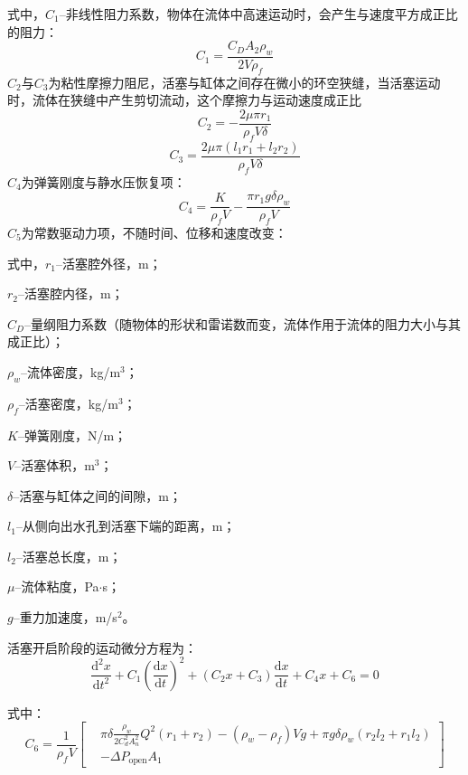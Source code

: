 式中，$C_1$--非线性阻力系数，物体在流体中高速运动时，会产生与速度平方成正比的阻力：
\begin{equation}
	C_1=\frac{C_DA_2\rho_w}{2V\rho_f}
\end{equation}
$C_2$与$C_3$为粘性摩擦力阻尼，活塞与缸体之间存在微小的环空狭缝，当活塞运动时，流体在狭缝中产生剪切流动，这个摩擦力与运动速度成正比
\begin{equation}
	C_2=-\frac{2\mu\pi r_1}{\rho_f V\delta}
\end{equation}
\begin{equation}
	C_3=\frac{2\mu\pi\left(l_1r_1+l_2r_2\right)}{\rho_f V \delta}
\end{equation}
$C_4$为弹簧刚度与静水压恢复项：
\begin{equation}
	C_4=\frac{K}{\rho_f V}-\frac{\pi r_1 g \delta \rho_w}{\rho_f V}
\end{equation}
 $C_5$为常数驱动力项，不随时间、位移和速度改变：
 
式中，$r_1$--活塞腔外径，m；

$r_2$--活塞腔内径，m；

$C_D$--量纲阻力系数（随物体的形状和雷诺数而变，流体作用于流体的阻力大小与其成正比）；

$\rho_w$--流体密度，kg/m$^3$；

$\rho_f$--活塞密度，kg/m$^3$；

$K$--弹簧刚度，N/m；

$V$--活塞体积，m$^3$；

$\delta$--活塞与缸体之间的间隙，m；

$l_1$--从侧向出水孔到活塞下端的距离，m；

$l_2$--活塞总长度，m；

$\mu$--流体粘度，Pa$\cdot$s；

$g$--重力加速度，m/s$^2$。
 
 活塞开启阶段的运动微分方程为：
 \begin{equation}
\frac{\mathrm{d}^2 x}{\mathrm{d}t^2}+C_1\left(\frac{\mathrm{d}x}{\mathrm{d}t}\right)^2 +(C_2 x+C_3)\frac{\mathrm{d}x}{\mathrm{d}t}+C_4 x +C_6=0
\end{equation}

 式中：
 \begin{equation}\label{eq:C6}
C_6=\frac{1}{\rho_f V}
\left[
\begin{aligned}
&\pi\delta \frac{\rho_w}{2C_d^2 A_n^2}Q^2(r_1+r_2)-(\rho_w-\rho_f)Vg+\pi g\delta\rho_w(r_2 l_2 + r_1 l_2)\\
&-\Delta P_{\mathrm{open}} A_1
\end{aligned}
\right]
\end{equation}


